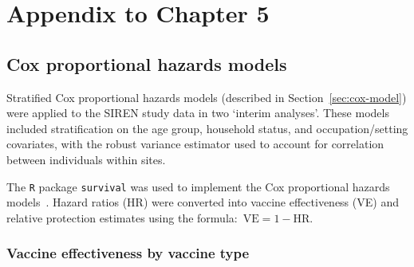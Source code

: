 \chapter{Appendix to Chapter 5}\label{appx:siren}

\graphicspath{{04_SIREN/Figs/}}



\begingroup\small

\endgroup

\section{Cox proportional hazards models}\label{appendix:siren-cox-models}

Stratified Cox proportional hazards models (described in Section~\ref{sec:cox-model}) were applied to the SIREN study data in two `interim analyses'. These models included stratification on the age group, household status, and occupation/setting covariates, with the robust variance estimator used to account for correlation between individuals within sites.

The \texttt{R} package \texttt{survival} was used to implement the Cox proportional hazards models~\parencite{Therneau1999-to}. Hazard ratios (HR) were converted into vaccine effectiveness (VE) and relative protection estimates using the formula:\ $\text{VE} = 1 - \text{HR}$\@.

\subsection{Vaccine effectiveness by vaccine type}

